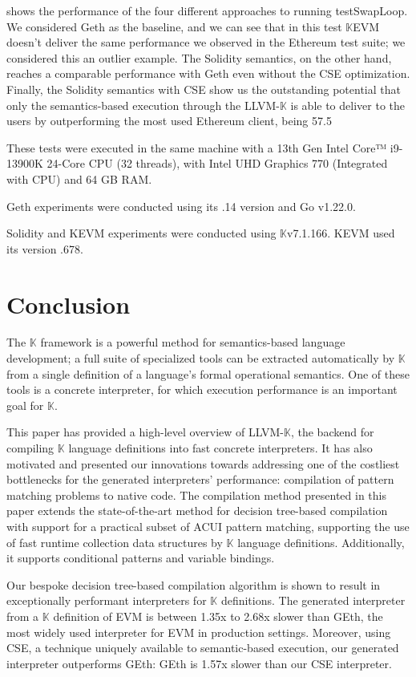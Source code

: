 \documentclass{article}
\theoremstyle{definition}
\newcommand{\K}{$\mathbb{K}$\xspace}
\newcommand{\KL}{LLVM-\K}
\newcommand{\code}[1]{{\small \ttfamily #1}}
\begin{document}
 shows the performance of the four different approaches to running \code{testSwapLoop}. We considered Geth as the baseline, and we can see that in this test {\K}EVM doesn't deliver the same performance we observed in the Ethereum test suite; we considered this an outlier example. The Solidity semantics, on the other hand, reaches a comparable performance with Geth even without the CSE optimization. Finally, the Solidity semantics with CSE show us the outstanding potential that only the semantics-based execution through the \KL is able to deliver to the users by outperforming the most used Ethereum client, being 57.5\

These tests were executed in the same machine with a 13th Gen Intel\textsuperscript{\tiny\textregistered} Core™ i9-13900K 24-Core CPU (32 threads), with Intel\textsuperscript{\tiny\textregistered} UHD Graphics 770 (Integrated with CPU) and 64 GB RAM.

Geth experiments were conducted using its \code{1.13.14} version and Go \code{v1.22.0}.

Solidity and KEVM experiments were conducted using \K \code{v7.1.166}. KEVM used its version \code{1.0.678}. 

\section{Conclusion}
The \K framework is a powerful method for semantics-based language development; a full suite of specialized tools can be extracted automatically by \K from a single definition of a language's formal operational semantics. One of these tools is a concrete interpreter, for which execution performance is an important goal for \K.

This paper has provided a high-level overview of \KL, the backend for compiling \K language definitions into fast concrete interpreters. It has also motivated and presented our innovations towards addressing one of the costliest bottlenecks for the generated interpreters' performance: compilation of pattern matching problems to native code. The compilation method presented in this paper extends the state-of-the-art method for decision tree-based compilation with support for a practical subset of ACUI pattern matching, supporting the use of fast runtime collection data structures by \K language definitions. Additionally, it supports conditional patterns and variable bindings.

Our bespoke decision tree-based compilation algorithm is shown to result in exceptionally performant interpreters for \K definitions. The generated interpreter from a \K definition of EVM is between 1.35x to 2.68x slower than GEth, the most widely used interpreter for EVM in production settings. Moreover, using CSE, a technique uniquely available to semantic-based execution, our generated interpreter outperforms GEth: GEth is 1.57x slower than our CSE interpreter.
\end{document}
